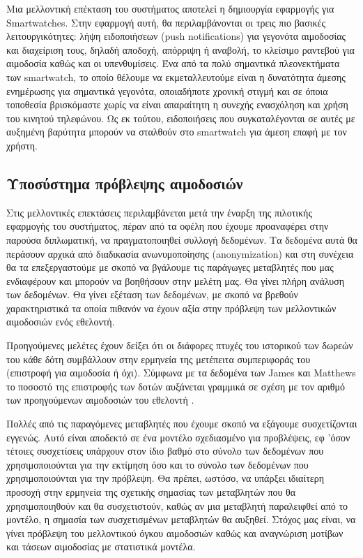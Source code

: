 	
	Μια μελλοντική επέκταση του συστήματος αποτελεί η δημιουργία εφαρμογής για Smartwatches. Στην εφαρμογή αυτή, θα περιλαμβάνονται οι τρεις πιο βασικές λειτουργικότητες: λήψη ειδοποιήσεων (push notifications) για γεγονότα αιμοδοσίας και διαχείριση τους, δηλαδή αποδοχή, απόρριψη ή αναβολή, το κλείσιμο ραντεβού για αιμοδοσία καθώς και οι υπενθυμίσεις. Ένα από τα πολύ σημαντικά πλεονεκτήματα των smartwatch, το οποίο θέλουμε να εκμεταλλευτούμε είναι η δυνατότητα άμεσης ενημέρωσης για σημαντικά γεγονότα, οποιαδήποτε χρονική στιγμή και σε όποια τοποθεσία βρισκόμαστε χωρίς να είναι απαραίτητη η συνεχής ενασχόληση και χρήση του κινητού τηλεφώνου. Ως εκ τούτου, ειδοποιήσεις που συγκαταλέγονται σε αυτές με αυξημένη βαρύτητα μπορούν να σταλθούν στο smartwatch για άμεση επαφή με τον χρήστη.
	
	
	
	
	\subsection{Υποσύστημα πρόβλεψης αιμοδοσιών}
		
		Στις μελλοντικές επεκτάσεις περιλαμβάνεται  μετά την έναρξη της πιλοτικής εφαρμογής του συστήματος, πέραν από τα οφέλη που έχουμε προαναφέρει στην παρούσα διπλωματική, να πραγματοποιηθεί συλλογή δεδομένων. Τα δεδομένα αυτά θα περάσουν αρχικά από διαδικασία ανωνυμοποίησης (anonymization) και στη συνέχεια θα τα επεξεργαστούμε με σκοπό να βγάλουμε τις παράγωγες μεταβλητές που μας ενδιαφέρουν και μπορούν να βοηθήσουν στην μελέτη μας. Θα γίνει πλήρη ανάλυση των δεδομένων. Θα γίνει εξέταση των δεδομένων, με σκοπό να βρεθούν χαρακτηριστικά τα οποία πιθανόν να έχουν αξία στην πρόβλεψη των μελλοντικών αιμοδοσιών ενός εθελοντή.
		
	Προηγούμενες μελέτες έχουν δείξει ότι οι διάφορες πτυχές του ιστορικού των δωρεών του κάθε δότη συμβάλλουν στην ερμηνεία της μετέπειτα συμπεριφοράς του (επιστροφή για αιμοδοσία ή όχι). Σύμφωνα με τα δεδομένα των James και Matthews το ποσοστό της επιστροφής των δοτών αυξάνεται γραμμικά σε σχέση με τον αριθμό των  προηγούμενων αιμοδοσιών του εθελοντή \cite{number_d}. 
		
		Πολλές από τις παραγόμενες μεταβλητές που έχουμε σκοπό να εξάγουμε συσχετίζονται εγγενώς. Αυτό είναι αποδεκτό σε ένα μοντέλο σχεδιασμένο για προβλέψεις, εφ 'όσον τέτοιες συσχετίσεις υπάρχουν στον ίδιο βαθμό στο σύνολο των δεδομένων που χρησιμοποιούνται για την εκτίμηση όσο και το σύνολο των δεδομένων που χρησιμοποιούνται για την πρόβλεψη. Θα πρέπει, ωστόσο, να υπάρξει ιδιαίτερη προσοχή στην ερμηνεία της σχετικής σημασίας των μεταβλητών που θα χρησιμοποιηθούν και θα συσχετιστούν, καθώς αν μια μεταβλητή παραλειφθεί από το μοντέλο, η σημασία των συσχετισμένων μεταβλητών θα αυξηθεί. Στόχος μας είναι, να γίνει πρόβλεψη του μελλοντικού όγκου αιμοδοσιών καθώς και αναγνώριση μοτίβων και τάσεων αιμοδοσίας με στατιστικά μοντέλα.
